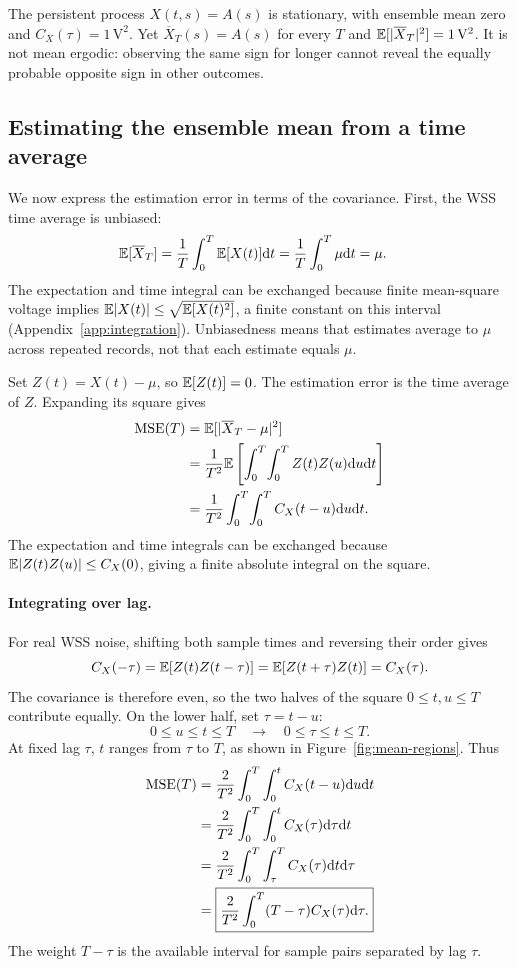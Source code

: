 The persistent process $X(t,s)=A(s)$ is stationary, with ensemble mean zero and $C_X(\tau)=1\,\mathrm{V}^2$. Yet $\overline X_T(s)=A(s)$ for every $T$ and
$\mathbb E[|\overline X_T|^2]=1\,\mathrm{V}^2$. It is not mean ergodic: observing the same sign for longer cannot reveal the equally probable opposite sign in other outcomes.

\subsection{Estimating the ensemble mean from a time average}
\label{sec:mean-proof}
We now express the estimation error in terms of the covariance. First, the WSS time average is unbiased:
\begin{align*}
\mathbb E[\overline X_T]
&=\frac1T\int_0^T\mathbb E[X(t)]\mathrm d t
=\frac1T\int_0^T\mu\mathrm d t=\mu.
\end{align*}
The expectation and time integral can be exchanged because finite mean-square voltage implies $\mathbb E|X(t)|\leq\sqrt{\mathbb E[X(t)^2]}$, a finite constant on this interval (Appendix~\ref{app:integration}). Unbiasedness means that estimates average to $\mu$ across repeated records, not that each estimate equals $\mu$.

Set $Z(t)=X(t)-\mu$, so $\mathbb E[Z(t)]=0$. The estimation error is the time average of $Z$. Expanding its square gives
\begin{align*}
\operatorname{MSE}(T)
&=\mathbb E[|\overline X_T-\mu|^2]\\
&=\frac1{T^2}\mathbb E\left[\int_0^T\!\int_0^T Z(t)Z(u)\mathrm d u\mathrm d t\right]\\
&=\frac1{T^2}\int_0^T\!\int_0^T C_X(t-u)\mathrm d u\mathrm d t.
\end{align*}
The expectation and time integrals can be exchanged because
$\mathbb E|Z(t)Z(u)|\leq C_X(0)$, giving a finite absolute integral on the square.

\paragraph{Integrating over lag.}
For real WSS noise, shifting both sample times and reversing their order gives
\[
C_X(-\tau)=\mathbb E[Z(t)Z(t-\tau)]
=\mathbb E[Z(t+\tau)Z(t)]=C_X(\tau).
\]
The covariance is therefore even, so the two halves of the square $0\leq t,u\leq T$ contribute equally. On the lower half, set $\tau=t-u$:
\[
0\leq u\leq t\leq T
\quad\longrightarrow\quad
0\leq\tau\leq t\leq T.
\]
At fixed lag $\tau$, $t$ ranges from $\tau$ to $T$, as shown in Figure~\ref{fig:mean-regions}. Thus
\begin{align}
\operatorname{MSE}(T)
&=\frac2{T^2}\int_0^T\int_0^t C_X(t-u)\mathrm d u\mathrm d t\notag\\
&=\frac2{T^2}\int_0^T\int_0^t C_X(\tau)\mathrm d\tau\mathrm d t\notag\\
&=\frac2{T^2}\int_0^T\int_\tau^T C_X(\tau)\mathrm d t\mathrm d\tau\notag\\
&=\boxed{\frac2{T^2}\int_0^T(T-\tau)C_X(\tau)\mathrm d\tau.}
\label{eq:mean-var}
\end{align}
The weight $T-\tau$ is the available interval for sample pairs separated by lag $\tau$.
\MeanErrorRegionsFigure

